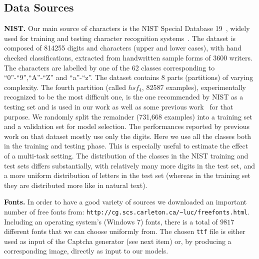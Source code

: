 \documentclass{article} %
\begin{document}
\vspace*{-3mm}
\subsection{Data Sources}
\vspace*{-2mm}

{\bf NIST.}
Our main source of characters is the NIST Special Database 19~\citep{Grother-1995}, 
widely used for training and testing character
recognition systems~\citep{Granger+al-2007,Cortes+al-2000,Oliveira+al-2002-short,Milgram+al-2005}. 
The dataset is composed of 814255 digits and characters (upper and lower cases), with hand checked classifications,
extracted from handwritten sample forms of 3600 writers. The characters are labelled by one of the 62 classes 
corresponding to ``0''-``9'',``A''-``Z'' and ``a''-``z''. The dataset contains 8 parts (partitions) of varying complexity. 
The fourth partition (called $hsf_4$, 82587 examples), 
experimentally recognized to be the most difficult one, is the one recommended 
by NIST as a testing set and is used in our work as well as some previous work~\citep{Granger+al-2007,Cortes+al-2000,Oliveira+al-2002-short,Milgram+al-2005}
for that purpose. We randomly split the remainder (731,668 examples) into a training set and a validation set for
model selection. 
The performances reported by previous work on that dataset mostly use only the digits.
Here we use all the classes both in the training and testing phase. This is especially
useful to estimate the effect of a multi-task setting.
The distribution of the classes in the NIST training and test sets differs
substantially, with relatively many more digits in the test set, and a more uniform distribution
of letters in the test set (whereas in the training set they are distributed
more like in natural text).
\vspace*{-1mm}

{\bf Fonts.} 
In order to have a good variety of sources we downloaded an important number of free fonts from:
{\tt http://cg.scs.carleton.ca/\textasciitilde luc/freefonts.html}.
Including an operating system's (Windows 7) fonts, there is a total of $9817$ different fonts that we can choose uniformly from.
The chosen {\tt ttf} file is either used as input of the Captcha generator (see next item) or, by producing a corresponding image, 
directly as input to our models.
\vspace*{-1mm}
\end{document}
